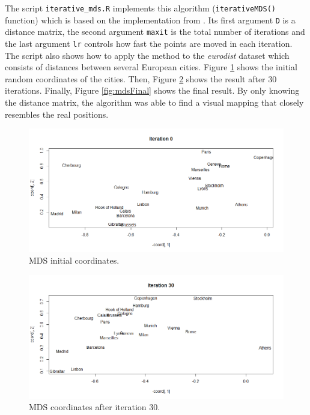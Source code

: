 \documentclass[
  11pt,
]{krantz}
\begin{document}
The script \texttt{iterative\_mds.R} implements this algorithm (\texttt{iterativeMDS()} function) which is based on the implementation from \citep{segaran2007}. Its first argument \texttt{D} is a distance matrix, the second argument \texttt{maxit} is the total number of iterations and the last argument \texttt{lr} controls how fast the points are moved in each iteration. The script also shows how to apply the method to the \emph{eurodist} dataset which consists of distances between several European cities. Figure \ref{fig:mds0} shows the initial random coordinates of the cities. Then, Figure \ref{fig:mds30} shows the result after \(30\) iterations. Finally, Figure \ref{fig:mdsFinal} shows the final result. By only knowing the distance matrix, the algorithm was able to find a visual mapping that closely resembles the real positions.

\begin{figure}

{\centering \includegraphics[width=1\linewidth]{images/mds_0} 

}

\caption{MDS initial coordinates.}\label{fig:mds0}
\end{figure}

\begin{figure}

{\centering \includegraphics[width=1\linewidth]{images/mds_30} 

}

\caption{MDS coordinates after iteration 30.}\label{fig:mds30}
\end{figure}
\end{document}
